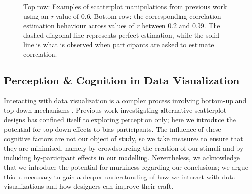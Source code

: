 \documentclass[manuscript,screen,review]{acmart}
\begin{document}
\begin{figure}


\caption{\label{fig-previous-manipulations}Top row: Examples of
scatterplot manipulations from previous work using an \textit{r} value
of 0.6. Bottom row: the corresponding correlation estimation behaviour
across values of \textit{r} between 0.2 and 0.99. The dashed diagonal
line represents perfect estimation, while the solid line is what is
observed when participants are asked to estimate correlation.}

\end{figure}%

\subsection{Perception \& Cognition in Data
Visualization}\label{sec-perception-cognition}

Interacting with data visualization is a complex process involving
bottom-up and top-down mechanisms
\citep{shah_2011, franconeri_2021, xiong_2022}. Previous work
investigating alternative scatterplot designs has confined itself to
exploring perception only; here we introduce the potential for top-down
effects to bias participants. The influence of these cognitive factors
are not our object of study, so we take measures to ensure that they are
minimised, namely by crowdsourcing the creation of our stimuli and by
including by-participant effects in our modelling. Nevertheless, we
acknowledge that we introduce the potential for murkiness regarding our
conclusions; we argue this is necessary to gain a deeper understanding
of how we interact with data visualizations and how designers can
improve their craft.
\end{document}
